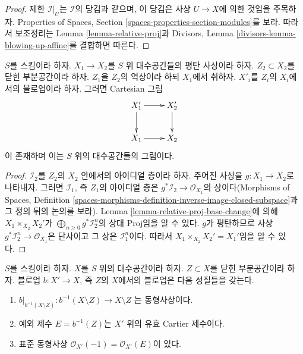 \begin{proof}
제한 $\mathcal{I}|_U$는 $\mathcal{I}$의 당김과 같으며, 이 당김은 사상
$U \to X$에 의한 것임을 주목하자. Properties of Spaces, Section
\ref{spaces-properties-section-modules}를 보라. 따라서 보조정리는 Lemma
\ref{lemma-relative-proj}과 Divisors, Lemma
\ref{divisors-lemma-blowing-up-affine}를 결합하면 따른다.
\end{proof}

\begin{lemma}
\label{lemma-flat-base-change-blowing-up}
$S$를 스킴이라 하자. $X_1 \to X_2$를 $S$ 위 대수공간들의 평탄
사상이라 하자. $Z_2 \subset X_2$를 닫힌 부분공간이라 하자.
$Z_1$을 $Z_2$의 역상이라 하되 $X_1$에서 취하자.
$X'_i$를 $Z_i$의 $X_i$에서의 블로업이라 하자. 그러면 Cartesian 그림
$$
\xymatrix{
X_1' \ar[r] \ar[d] & X_2' \ar[d] \\
X_1 \ar[r] & X_2
}
$$
이 존재하며 이는 $S$ 위의 대수공간들의 그림이다.
\end{lemma}

\begin{proof}
$\mathcal{I}_2$를 $Z_2$의 $X_2$ 안에서의 아이디얼 층이라 하자. 주어진
사상을 $g : X_1 \to X_2$로 나타내자. 그러면 $\mathcal{I}_1$, 즉
$Z_1$의 아이디얼 층은
$g^*\mathcal{I}_2 \to \mathcal{O}_{X_1}$의 상이다(Morphisms of Spaces,
Definition
\ref{spaces-morphisms-definition-inverse-image-closed-subspace}과 그 정의
뒤의 논의를 보라). Lemma \ref{lemma-relative-proj-base-change}에 의해
$X_1 \times_{X_2} X_2'$가
$\bigoplus_{n \geq 0} g^*\mathcal{I}_2^n$의 상대 Proj임을 알 수 있다.
$g$가 평탄하므로 사상
$g^*\mathcal{I}_2^n \to \mathcal{O}_{X_1}$은 단사이고 그 상은
$\mathcal{I}_1^n$이다. 따라서
$X_1 \times_{X_2} X_2' = X_1'$임을 알 수 있다.
\end{proof}

\begin{lemma}
\label{lemma-blowing-up-gives-effective-Cartier-divisor}
$S$를 스킴이라 하자. $X$를 $S$ 위의 대수공간이라 하자.
$Z \subset X$를 닫힌 부분공간이라 하자. 블로업
$b : X' \to X$, 즉 $Z$의 $X$에서의 블로업은 다음 성질들을 갖는다.
\begin{enumerate}
\item $b|_{b^{-1}(X \setminus Z)} : b^{-1}(X \setminus Z) \to X \setminus Z$
는 동형사상이다.
\item 예외 제수 $E = b^{-1}(Z)$는 $X'$ 위의 유효 Cartier 제수이다.
\item 표준 동형사상
$\mathcal{O}_{X'}(-1) = \mathcal{O}_{X'}(E)$이 있다.
\end{enumerate}
\end{lemma}

